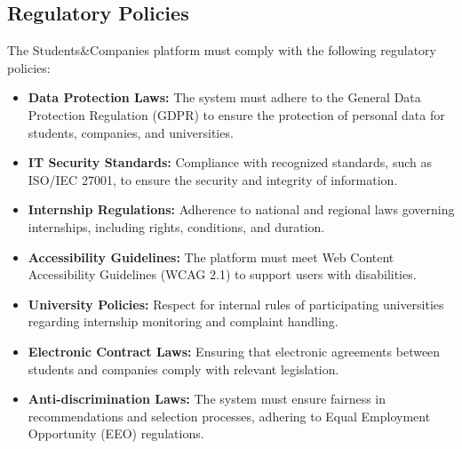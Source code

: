 \subsection{Regulatory Policies}
\label{subsec:regulatory-policies}
The Students\&Companies platform must comply with the following regulatory policies:
\begin{itemize}
    \item \textbf{Data Protection Laws:} The system must adhere to the General Data Protection Regulation (GDPR) to ensure the protection of personal data for students, companies, and universities.
    \item \textbf{IT Security Standards:} Compliance with recognized standards, such as ISO/IEC 27001, to ensure the security and integrity of information.
    \item \textbf{Internship Regulations:} Adherence to national and regional laws governing internships, including rights, conditions, and duration.
    \item \textbf{Accessibility Guidelines:} The platform must meet Web Content Accessibility Guidelines (WCAG 2.1) to support users with disabilities.
    \item \textbf{University Policies:} Respect for internal rules of participating universities regarding internship monitoring and complaint handling.
    \item \textbf{Electronic Contract Laws:} Ensuring that electronic agreements between students and companies comply with relevant legislation.
    \item \textbf{Anti-discrimination Laws:} The system must ensure fairness in recommendations and selection processes, adhering to Equal Employment Opportunity (EEO) regulations.
\end{itemize}


